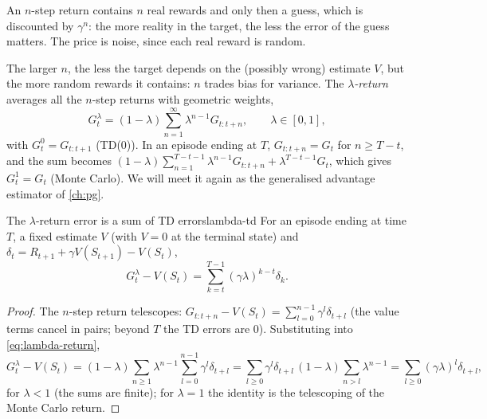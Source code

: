 \begin{intuition}
  An $n$-step return contains $n$ real rewards and only then a guess, which
  is discounted by $\gamma^n$: the more reality in the target, the less the
  error of the guess matters. The price is noise, since each real reward is
  random.
\end{intuition}

The larger $n$, the less the target depends on the (possibly wrong)
estimate $V$, but the more random rewards it contains: $n$ trades bias for
variance. The \emph{$\lambda$-return} averages all the $n$-step returns
with geometric weights,
\begin{equation}
  \label{eq:lambda-return}
  G_t^\lambda = (1 - \lambda) \sum_{n=1}^{\infty} \lambda^{n-1}
  G_{t:t+n}, \qquad \lambda \in [0, 1],
\end{equation}
with $G_t^0 = G_{t:t+1}$ (TD(0)). In an episode ending at $T$, $G_{t:t+n} =
G_t$ for $n \geq T - t$, and the sum becomes $(1 - \lambda) \sum_{n=1}^{T -
t - 1} \lambda^{n-1} G_{t:t+n} + \lambda^{T - t - 1} G_t$, which gives
$G_t^1 = G_t$ (Monte Carlo). We will
meet it again as the generalised advantage estimator of \cref{ch:pg}.

\begin{lemma}{The $\lambda$-return error is a sum of TD errors}{lambda-td}
  For an episode ending at time $T$, a fixed estimate $V$ (with $V = 0$ at
  the terminal state) and $\delta_t = R_{t+1} + \gamma V(S_{t+1}) -
  V(S_t)$,
  \begin{equation}
    G_t^\lambda - V(S_t) = \sum_{k=t}^{T-1} (\gamma \lambda)^{k-t}
    \delta_k.
  \end{equation}
\end{lemma}

\begin{proof}
  The $n$-step return telescopes: $G_{t:t+n} - V(S_t) = \sum_{l=0}^{n-1}
  \gamma^l \delta_{t+l}$ (the value terms cancel in pairs; beyond $T$ the
  TD errors are $0$). Substituting into \eqref{eq:lambda-return},
  \begin{equation*}
    G_t^\lambda - V(S_t) = (1 - \lambda) \sum_{n \geq 1} \lambda^{n-1}
    \sum_{l=0}^{n-1} \gamma^l \delta_{t+l}
    = \sum_{l \geq 0} \gamma^l \delta_{t+l}\, (1 - \lambda) \sum_{n > l}
    \lambda^{n-1} = \sum_{l \geq 0} (\gamma \lambda)^l \delta_{t+l},
  \end{equation*}
  for $\lambda < 1$ (the sums are finite); for $\lambda = 1$ the identity is
  the telescoping of the Monte Carlo return.
\end{proof}

